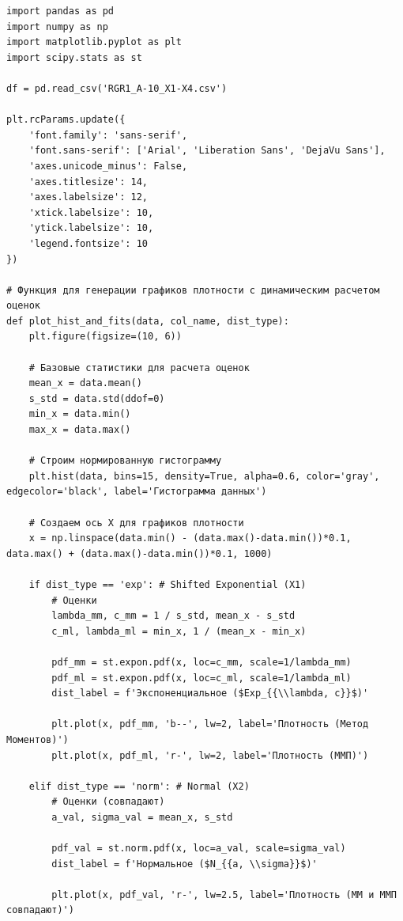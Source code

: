 \documentclass[a4paper,12pt]{article}
\begin{document}
\begin{lstlisting}[style=mypython, caption={Содержание файла 8\_plots\_generation.py}]
import pandas as pd
import numpy as np
import matplotlib.pyplot as plt
import scipy.stats as st

df = pd.read_csv('RGR1_A-10_X1-X4.csv')

plt.rcParams.update({
    'font.family': 'sans-serif',
    'font.sans-serif': ['Arial', 'Liberation Sans', 'DejaVu Sans'],
    'axes.unicode_minus': False,
    'axes.titlesize': 14,
    'axes.labelsize': 12,
    'xtick.labelsize': 10,
    'ytick.labelsize': 10,
    'legend.fontsize': 10
})

# Функция для генерации графиков плотности с динамическим расчетом оценок
def plot_hist_and_fits(data, col_name, dist_type):
    plt.figure(figsize=(10, 6))
    
    # Базовые статистики для расчета оценок
    mean_x = data.mean()
    s_std = data.std(ddof=0)
    min_x = data.min()
    max_x = data.max()
    
    # Строим нормированную гистограмму
    plt.hist(data, bins=15, density=True, alpha=0.6, color='gray', edgecolor='black', label='Гистограмма данных')
    
    # Создаем ось X для графиков плотности
    x = np.linspace(data.min() - (data.max()-data.min())*0.1, data.max() + (data.max()-data.min())*0.1, 1000)
    
    if dist_type == 'exp': # Shifted Exponential (X1)
        # Оценки
        lambda_mm, c_mm = 1 / s_std, mean_x - s_std
        c_ml, lambda_ml = min_x, 1 / (mean_x - min_x)
        
        pdf_mm = st.expon.pdf(x, loc=c_mm, scale=1/lambda_mm)
        pdf_ml = st.expon.pdf(x, loc=c_ml, scale=1/lambda_ml)
        dist_label = f'Экспоненциальное ($Exp_{{\\lambda, c}}$)'
        
        plt.plot(x, pdf_mm, 'b--', lw=2, label='Плотность (Метод Моментов)')
        plt.plot(x, pdf_ml, 'r-', lw=2, label='Плотность (ММП)')
        
    elif dist_type == 'norm': # Normal (X2)
        # Оценки (совпадают)
        a_val, sigma_val = mean_x, s_std
        
        pdf_val = st.norm.pdf(x, loc=a_val, scale=sigma_val)
        dist_label = f'Нормальное ($N_{{a, \\sigma}}$)'
        
        plt.plot(x, pdf_val, 'r-', lw=2.5, label='Плотность (ММ и ММП совпадают)')
        

\end{lstlisting}
\end{document}
